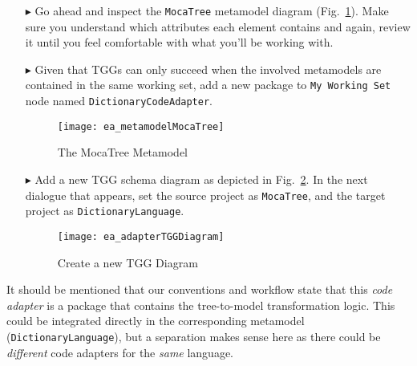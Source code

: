 \begin{itemize}

\item[$\blacktriangleright$] Go ahead and inspect the \texttt{MocaTree} metamodel diagram (Fig.~\ref{ea:mocaTree}). Make sure you understand which attributes
each element contains and again, review it until you feel comfortable with what you'll be working with.

\item[$\blacktriangleright$] Given that TGGs can only succeed when the involved metamodels are contained in the same working set, add a new package to
\texttt{My Working Set} node named \texttt{Dict\-ion\-ary\-Code\-Adap\-ter}.

\newpage

\begin{figure}[htpb]
\begin{center}
  \texttt{[image: ea\_metamodelMocaTree]}
  \caption{The MocaTree Metamodel}
  \label{ea:mocaTree}
\end{center}
\end{figure}

\vspace{1cm}

\item[$\blacktriangleright$] Add a new TGG schema diagram as depicted in Fig.~\ref{ea:newTGGDiagram}. In the next dialogue that appears, set the source project
as \texttt{MocaTree}, and the target project as \texttt{Dict\-ion\-ary\-Lang\-uage}.

\vspace{1cm}

\begin{figure}[htpb]
\begin{center}
  \texttt{[image: ea\_adapterTGGDiagram]}
  \caption{Create a new TGG Diagram}
  \label{ea:newTGGDiagram}
\end{center}
\end{figure}

\end{itemize}

\clearpage

It should be mentioned that our conventions and workflow state that this \emph{code adapter} is a package that contains the tree-to-model transformation logic.
This could be integrated directly in the corresponding metamodel (\texttt{Dic\-tion\-ary\-Language}), but a separation makes sense here as there could be
\emph{different} code adapters for the \emph{same} language.

